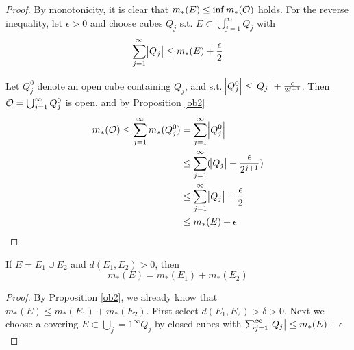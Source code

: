 \documentclass[11pt]{article}
\begin{document}
\begin{proof}
By monotonicity, it is clear that \(m_*(E)\le\inf m_*(\mathcal{O})\) holds. For the
reverse inequality, let \(\epsilon>0\) and choose cubes \(Q_j\) s.t.
\(E\subset\bigcup_{j=1}^\infty Q_j\) with
\begin{equation*}
\displaystyle\sum_{j=1}^\infty\abs{Q_j}\le m_*(E)+\frac{\epsilon}{2}
\end{equation*}

Let \(Q_j^0\) denote an open cube containing \(Q_j\), and s.t. 
\(\abs{Q_j^0}\le\abs{Q_j}+\frac{\epsilon}{2^{j+1}}\). Then 
\(\mathcal{O}=\bigcup_{j=1}^\infty Q_j^0\) is open, and by Proposition \ref{ob2}
\begin{align*}
m_*(\mathcal{O})\le \displaystyle\sum_{j=1}^\infty m_*(Q_j^0)&=
\displaystyle\sum_{j=1}^\infty\abs{Q_j^0}\\
&\le \displaystyle\sum_{j=1}^\infty(\abs{Q_j}+\frac{\epsilon}{2^{j+1}})\\
&\le \displaystyle\sum_{j=1}^\infty\abs{Q_j}+\frac{\epsilon}{2}\\
&\le m_*(E)+\epsilon
\end{align*}
\end{proof}

\begin{proposition}[]
If \(E=E_1\cup E_2\) and \(d(E_1,E_2)>0\), then
\begin{equation*}
m_*(E)=m_*(E_1)+m_*(E_2)
\end{equation*}
\end{proposition}

\begin{proof}
By Proposition \ref{ob2}, we already know that \(m_*(E)\le m_*(E_1)+m_*(E_2)\).
First select \(d(E_1,E_2)>\delta>0\). Next we choose a covering
\(E\subset\bigcup_j=1^\infty Q_j\) by closed cubes with 
\(\sum_{j=1}^\infty\abs{Q_j}\le m_*(E)+\epsilon\)
\end{proof}
\end{document}

